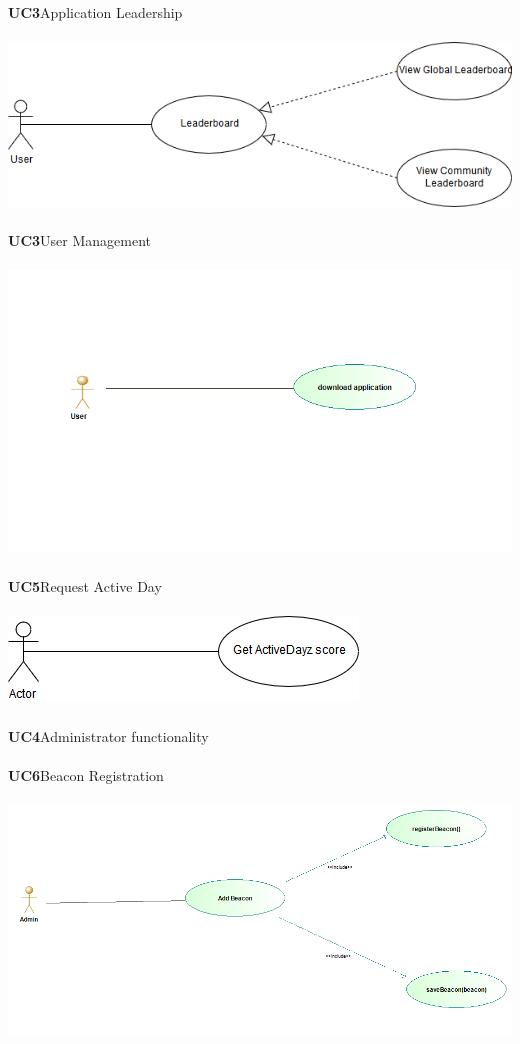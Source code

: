 \documentclass[11pt]{article}
\begin{document}
\textbf{UC3}Application Leadership\\\\
\includegraphics[scale=0.5]{./DiagramsAzhar/LeaderBoard.png}\\\\
\textbf{UC3}User Management\\\\
\includegraphics[scale=0.5]{./DiagramsTshepo/downloadApp.png}\\\\
\textbf{UC5}Request Active Day\\\\
\includegraphics[scale=0.5]{./DiagramsAzhar/Beacon.png}\\\\
\textbf{UC4}Administrator functionality\\\\
\textbf{UC6}Beacon Registration\\\\
\includegraphics[scale=0.5]{./DiagramsTshepo/addBeacon.png}\\
\end{document}
